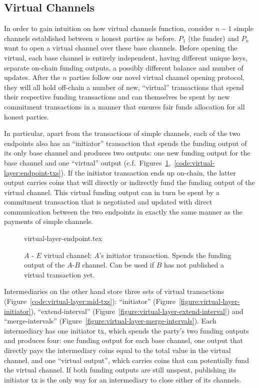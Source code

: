 \subsection{Virtual Channels}
  In order to gain intuition on how virtual channels function, consider $n-1$
  simple channels established between $n$ honest parties as before. $P_1$ (the
  funder) and $P_n$ want to open a virtual channel over these base channels.
  Before opening the virtual, each base channel is entirely independent, having
  different unique keys, separate on-chain funding outputs, a possibly different
  balance and number of updates. After the $n$ parties follow our novel virtual
  channel opening protocol, they will all hold off-chain a number of new,
  ``virtual'' transactions that spend their respective funding transactions and
  can themselves be spent by new commitment transactions in a manner that
  ensures fair funds allocation for all honest parties.

  In particular, apart from the transactions of simple channels, each of the two
  endpoints also has an ``initiator'' transaction that spends the funding output
  of its only base channel and produces two outputs: one new funding output for
  the base channel and one ``virtual'' output (c.f.\
  Figures~\ref{figure:virtual-layer-endpoint},~\ref{code:virtual-layer:endpoint-txs}).
  If the
  initiator 
  transaction ends up on-chain, the latter output carries coins that
  will directly or indirectly fund the funding output of the virtual channel.
  This virtual funding output can in turn be spent by a commitment transaction
  that is negotiated and updated with direct communication between the two
  endpoints in exactly the same manner as the payments of simple channels.

  \begin{figure}
    {virtual-layer-endpoint.tex}
    \caption{$A$ - $E$ virtual channel: $A$'s initiator transaction. Spends the
    funding output of the $A$-$B$ channel. Can be used if $B$ has not published
    a virtual transaction yet.}
    \label{figure:virtual-layer-endpoint}
  \end{figure}

  Intermediaries on the other hand store three sets of virtual transactions
  (Figure~\ref{code:virtual-layer:mid-txs}): ``initiator''
  (Figure~\ref{figure:virtual-layer-initiator}), ``extend-interval''
  (Figure~\ref{figure:virtual-layer-extend-interval}) and ``merge-intervals''
  (Figure~\ref{figure:virtual-layer-merge-intervals}). Each intermediary has one
  initiator tx, which spends the party's two funding outputs and produces four:
  one funding output for each base channel, one output that directly pays the
  intermediary coins equal to the total value in the virtual channel, and one
  ``virtual output'', which carries coins that can potentially fund the virtual
  channel. If both funding outputs are still unspent, publishing its initiator
  tx is the only way for an intermediary to close either of its channels.

